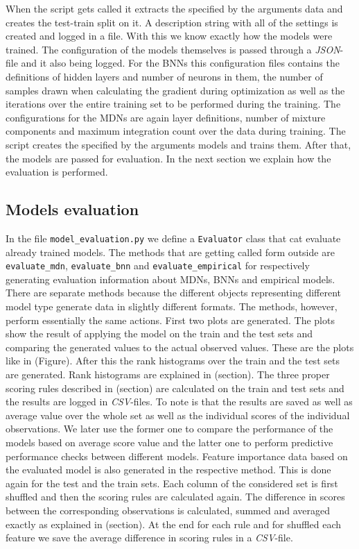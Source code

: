 \documentclass[12pt,a4paper,twoside]{scrartcl}
\numberwithin{equation}{section}
\begin{document}
When the script gets called it extracts the specified by the arguments data and creates the test-train split on it. A description string with all of the settings is created and logged in a file. With this we know exactly how the models were trained. The configuration of the models themselves is passed through a \emph{JSON}-file and it also being logged. For the BNNs this configuration files contains the definitions of hidden layers and number of neurons in them, the number of samples drawn when calculating the gradient during optimization as well as the iterations over the entire training set to be performed during the training. The configurations for the MDNs are again layer definitions, number of mixture components and maximum integration count over the data during training. The script creates the specified by the arguments models and trains them. After that, the models are passed for evaluation. In the next section we explain how the evaluation is performed.
\subsection{Models evaluation}
\label{sec:models-eval}
In the file \texttt{model_evaluation.py} we define a \texttt{Evaluator} class that cat evaluate already trained models. The methods that are getting called form outside are \texttt{evaluate_mdn}, \texttt{evaluate_bnn} and \texttt{evaluate_empirical} for respectively generating evaluation information about MDNs, BNNs and empirical models. There are separate methods because the different objects representing different model type generate data in slightly different formats. The methods, however, perform essentially the same actions. First two plots are generated. The plots show the result of applying the model on the train and the test sets and comparing the generated values to the actual observed values. These are the plots like in (Figure). After this the rank histograms over the train and the test sets are generated. Rank histograms are explained in (section). The three proper scoring rules described in (section) are calculated on the train and test sets and the results are logged in \emph{CSV}-files. To note is that the results are saved as well as average value over the whole set as well as the individual scores of the individual observations. We later use the former one to compare the performance of the models based on average score value and the latter one to perform predictive performance checks between different models. Feature importance data based on the evaluated model is also generated in the respective method. This is done again for the test and the train sets. Each column of the considered set is first shuffled and then the scoring rules are calculated again. The difference in scores between the corresponding observations is calculated, summed and averaged exactly as explained in (section). At the end for each rule and for shuffled each feature we save the average difference in scoring rules in a \emph{CSV}-file.
\end{document}
